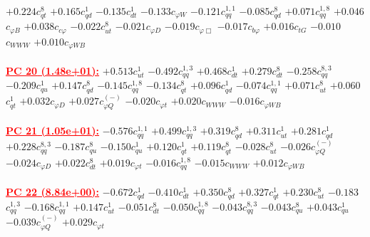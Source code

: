 \documentclass{article}
\begin{document}
{$+0.224$}{\rm $c_{qt}^{8}$} 
{$+0.165$}{\rm $c_{qd}^{1}$} 
{$-0.135$}{\rm $c_{dt}^{1}$} 
{$-0.133$}{\rm $c_{\varphi W}$} 
{$-0.121$}{\rm $c_{qq}^{1,1}$} 
{$-0.085$}{\rm $c_{qd}^{8}$} 
{$+0.071$}{\rm $c_{qq}^{1,8}$} 
{$+0.046$}{\rm $c_{\varphi B}$} 
{$+0.038$}{\rm $c_{c \varphi}$} 
{$-0.022$}{\rm $c_{ut}^{8}$} 
{$-0.021$}{\rm $c_{\varphi D}$} 
{$-0.019$}{\rm $c_{\varphi \Box}$} 
{$-0.017$}{\rm $c_{b \varphi}$} 
{$+0.016$}{\rm $c_{tG}$} 
{$-0.010$}{\rm $c_{WWW}$} 
{$+0.010$}{\rm $c_{\varphi WB}$} 
 \nonumber \\ \nonumber \\ 
\noindent \textcolor{red}{\underline{\bf{PC 20} (1.48e+01):}}
{$+0.513$}{\rm $c_{ut}^{1}$} 
{$-0.492$}{\rm $c_{qq}^{1,3}$} 
{$+0.468$}{\rm $c_{dt}^{1}$} 
{$+0.279$}{\rm $c_{dt}^{8}$} 
{$-0.258$}{\rm $c_{qq}^{8,3}$} 
{$-0.209$}{\rm $c_{qu}^{1}$} 
{$+0.147$}{\rm $c_{qd}^{8}$} 
{$-0.145$}{\rm $c_{qq}^{1,8}$} 
{$-0.134$}{\rm $c_{qt}^{8}$} 
{$+0.096$}{\rm $c_{qd}^{1}$} 
{$-0.074$}{\rm $c_{qq}^{1,1}$} 
{$+0.071$}{\rm $c_{ut}^{8}$} 
{$+0.060$}{\rm $c_{qt}^{1}$} 
{$+0.032$}{\rm $c_{\varphi D}$} 
{$+0.027$}{\rm $c_{\varphi Q}^{(-)}$} 
{$-0.020$}{\rm $c_{\varphi t}$} 
{$+0.020$}{\rm $c_{WWW}$} 
{$-0.016$}{\rm $c_{\varphi WB}$} 
 \nonumber \\ \nonumber \\ 
\noindent \textcolor{red}{\underline{\bf{PC 21} (1.05e+01):}}
{$-0.576$}{\rm $c_{qq}^{1,1}$} 
{$+0.499$}{\rm $c_{qq}^{1,3}$} 
{$+0.319$}{\rm $c_{qd}^{8}$} 
{$+0.311$}{\rm $c_{ut}^{1}$} 
{$+0.281$}{\rm $c_{qd}^{1}$} 
{$+0.228$}{\rm $c_{qq}^{8,3}$} 
{$-0.187$}{\rm $c_{qu}^{8}$} 
{$-0.150$}{\rm $c_{qu}^{1}$} 
{$+0.120$}{\rm $c_{qt}^{1}$} 
{$+0.119$}{\rm $c_{qt}^{8}$} 
{$-0.028$}{\rm $c_{ut}^{8}$} 
{$-0.026$}{\rm $c_{\varphi Q}^{(-)}$} 
{$-0.024$}{\rm $c_{\varphi D}$} 
{$+0.022$}{\rm $c_{dt}^{8}$} 
{$+0.019$}{\rm $c_{\varphi t}$} 
{$-0.016$}{\rm $c_{qq}^{1,8}$} 
{$-0.015$}{\rm $c_{WWW}$} 
{$+0.012$}{\rm $c_{\varphi WB}$} 
 \nonumber \\ \nonumber \\ 
\noindent \textcolor{red}{\underline{\bf{PC 22} (8.84e+00):}}
{$-0.672$}{\rm $c_{qd}^{1}$} 
{$-0.410$}{\rm $c_{dt}^{1}$} 
{$+0.350$}{\rm $c_{qd}^{8}$} 
{$+0.327$}{\rm $c_{qt}^{1}$} 
{$+0.230$}{\rm $c_{ut}^{8}$} 
{$-0.183$}{\rm $c_{qq}^{1,3}$} 
{$-0.168$}{\rm $c_{qq}^{1,1}$} 
{$+0.147$}{\rm $c_{ut}^{1}$} 
{$-0.051$}{\rm $c_{dt}^{8}$} 
{$-0.050$}{\rm $c_{qq}^{1,8}$} 
{$-0.043$}{\rm $c_{qq}^{8,3}$} 
{$-0.043$}{\rm $c_{qu}^{8}$} 
{$+0.043$}{\rm $c_{qu}^{1}$} 
{$-0.039$}{\rm $c_{\varphi Q}^{(-)}$} 
{$+0.029$}{\rm $c_{\varphi t}$} 
\end{document}
